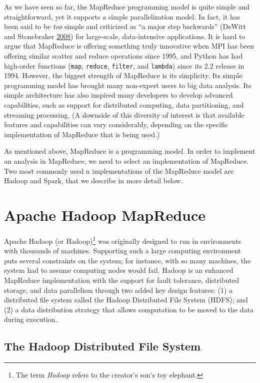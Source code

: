 \documentclass[]{krantz}
\begin{document}
\pagebreak
As we have seen so far, the MapReduce programming model is quite simple
and straightforward, yet it supports a simple parallelization model. In
fact, it has been said to be \emph{too} simple and criticized as ``a
major step backwards'' (DeWitt and Stonebraker
\protect\hyperlink{ref-MapReduceBad}{2008}) for large-scale,
data-intensive applications. It is hard to argue that MapReduce is
offering something truly innovative when MPI has been offering similar
scatter and reduce operations since 1995, and Python has had high-order
functions (\texttt{map}, \texttt{reduce}, \texttt{filter}, and
\texttt{lambda}) since its 2.2 release in 1994. However, the biggest
strength of MapReduce is its simplicity. Its simple programming model
has brought many non-expert users to big data analysis. Its simple
architecture has also inspired many developers to develop advanced
capabilities, such as support for distributed computing, data
partitioning, and streaming processing. (A downside of this diversity of
interest is that available features and capabilities can vary
considerably, depending on the specific implementation of MapReduce that
is being used.)

As mentioned above, MapReduce is a programming model. In order to
implement an analysis in MapReduce, we need to select an implementation
of MapReduce. Two most commonly used n implementations of the MapReduce
model are Hadoop and Spark, that we describe in more detail below.

\section{Apache Hadoop MapReduce}\label{apache-hadoop-mapreduce}

Apache Hadoop (or Hadoop)\footnote{The term \emph{Hadoop} refers to the
  creator's son's toy elephant.} was originally designed to run in
environments with thousands of machines. Supporting such a large
computing environment puts several constraints on the system; for
instance, with so many machines, the system had to assume computing
nodes would fail. Hadoop is an enhanced MapReduce implementation with
the support for fault tolerance, distributed storage, and data
parallelism through two added key design features: (1) a distributed
file system called the Hadoop Distributed File System (HDFS); and (2) a
data distribution strategy that allows computation to be moved to the
data during execution.

\subsection{The Hadoop Distributed File
System}\label{the-hadoop-distributed-file-system}
\end{document}
